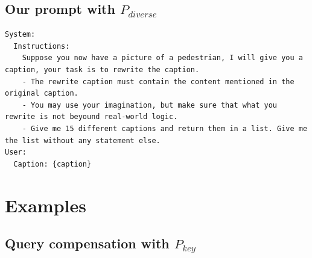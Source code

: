 \subsection{Our prompt with $P_{diverse}$}


\begin{minipage}[t]{0.48\textwidth}
\begin{tcolorbox}[
  title=Prompt with $P_{diverse}$,
  colback=lightgray,
  colframe=gray!70,
  fonttitle=\bfseries,
  boxrule=0.5pt,
  arc=3pt,
  top=1mm, bottom=1mm, left=1mm, right=1mm,
  sharp corners,
]

\lstset{
  basicstyle=\ttfamily,    
  breaklines=true,              
  breakatwhitespace=true,      
  columns=fullflexible,
  keepspaces=true
}

\footnotesize

\begin{lstlisting}[language=Prompt]
System:
  Instructions:
    Suppose you now have a picture of a pedestrian, I will give you a caption, your task is to rewrite the caption.
    - The rewrite caption must contain the content mentioned in the original caption.
    - You may use your imagination, but make sure that what you rewrite is not beyound real-world logic.
    - Give me 15 different captions and return them in a list. Give me the list without any statement else.
User:
  Caption: {caption}
\end{lstlisting}

\end{tcolorbox}
\end{minipage}


\section{Examples}
\subsection{Query compensation with $P_{key}$}



